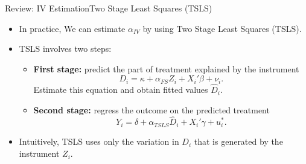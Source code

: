 \documentclass[dvipsnames,hyperref={pdfpagelabels=false}]{beamer}
\begin{document}
\begin{frame}{Review: IV Estimation}{Two Stage Least Squares (TSLS)}
	\begin{itemize} 
		
	\item In practice,  We can estimate $\alpha_{IV}$ by using Two Stage Least Squares (TSLS).

	\vspace{0.2cm}

	\item TSLS involves two steps:
	\vspace{0.2cm}

	\begin{itemize}
		\item[1.] \textbf{First stage:} predict the part of treatment explained by the instrument
		\begin{equation*}
			D_i = \kappa + \alpha_{FS} Z_i + X_i' \beta + \nu_i.
		\end{equation*}
		Estimate this equation and obtain fitted values $\hat{D}_i$.

		\vspace{0.2cm}

		\item[2.] \textbf{Second stage:} regress the outcome on the predicted treatment
		\begin{equation*}
			Y_i = \delta + \alpha_{TSLS} \hat{D}_i + X_i' \gamma + u_i^*.
		\end{equation*}
	\end{itemize}

	\vspace{0.2cm}

	\item Intuitively, TSLS uses only the variation in $D_i$ that is generated by the instrument $Z_i$.
	\end{itemize}
\end{frame}
\end{document}

